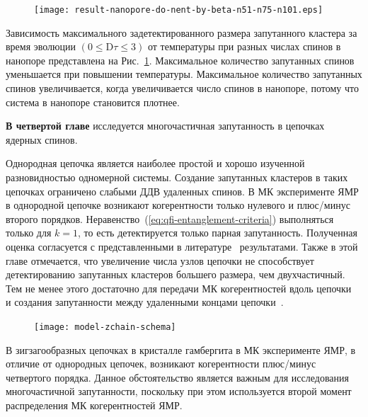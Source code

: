 \begin{figure}[H]
 	\texttt{[image: result-nanopore-do-nent-by-beta-n51-n75-n101.eps]}
	\caption{\protect}
	\label{fig:result-nanopore-do-nent-by-beta-n51-n75-n101}
\end{figure}

Зависимость максимального задетектированного размера запутанного кластера за время эволюции $({0}\leq \mathrm{D}\tau\leq{3})$ от температуры при разных числах спинов в нанопоре представлена на Рис.~\ref{fig:result-nanopore-do-nent-by-beta-n51-n75-n101}.
Максимальное количество запутанных спинов уменьшается при повышении температуры.
Максимальное количество запутанных спинов увеличивается, когда увеличивается число спинов в нанопоре, потому что система в нанопоре становится плотнее.


\textbf{В четвертой главе} исследуется многочастичная запутанность в цепочках ядерных спинов.

Однородная цепочка является наиболее простой и хорошо изученной разновидностью одномерной системы.
Создание запутанных кластеров в таких цепочках ограничено слабыми ДДВ удаленных спинов.
В МК эксперименте ЯМР в однородной цепочке возникают когерентности только нулевого и плюс/минус второго порядков. Неравенство~(\ref{eq:qfi-entanglement-criteria}) выполняться только для $k = 1$, то есть детектируется только парная запутанность.
Полученная оценка согласуется с представленными в литературе~\cite{Doronin2007, Feldman2012} результатами.
Также в этой главе отмечается,
что увеличение числа узлов цепочки не способствует детектированию запутанных кластеров большего размера, чем двухчастичный.
Тем не менее этого достаточно для передачи МК когерентностей вдоль цепочки~\cite{Bochkin2018qip} и создания запутанности между удаленными концами цепочки~\cite{Lazarev2019}.

\begin{figure}
  \texttt{[image: model-zchain-schema]}
  \caption{\protect}
  \label{fig:model-zchain-schema}
\end{figure}

В зигзагообразных цепочках в кристалле гамбергита в МК эксперименте ЯМР,
в отличие от однородных цепочек,
возникают когерентности плюс/минус четвертого порядка\cite{Bochkin2019}.
Данное обстоятельство является важным для исследования многочастичной запутанности,
поскольку при этом используется второй момент распределения МК когерентностей ЯМР.


